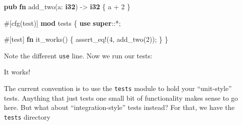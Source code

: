 \documentclass[a4paper,]{book}
\newenvironment{Shaded}{\begin{snugshade}}{\end{snugshade}}
\newcommand{\KeywordTok}[1]{\textcolor[rgb]{0.13,0.29,0.53}{\textbf{{#1}}}}
\newcommand{\DecValTok}[1]{\textcolor[rgb]{0.00,0.00,0.81}{{#1}}}
\newcommand{\OtherTok}[1]{\textcolor[rgb]{0.56,0.35,0.01}{{#1}}}
\newcommand{\NormalTok}[1]{{#1}}
\begin{document}
\begin{Shaded}
\begin{Highlighting}[]

\KeywordTok{pub} \KeywordTok{fn} \NormalTok{add_two(a: }\KeywordTok{i32}\NormalTok{) -> }\KeywordTok{i32} \NormalTok{\{}
    \NormalTok{a + }\DecValTok{2}
\NormalTok{\}}

\OtherTok{#[}\NormalTok{cfg}\OtherTok{(}\NormalTok{test}\OtherTok{)]}
\KeywordTok{mod} \NormalTok{tests \{}
    \KeywordTok{use} \KeywordTok{super}\NormalTok{::*;}

    \OtherTok{#[}\NormalTok{test}\OtherTok{]}
    \KeywordTok{fn} \NormalTok{it_works() \{}
        \OtherTok{assert_eq!}\NormalTok{(}\DecValTok{4}\NormalTok{, add_two(}\DecValTok{2}\NormalTok{));}
    \NormalTok{\}}
\NormalTok{\}}
\end{Highlighting}
\end{Shaded}

Note the different \texttt{use} line. Now we run our tests:

\begin{Shaded}
\end{Shaded}

It works!

The current convention is to use the \texttt{tests} module to hold your
``unit-style'' tests. Anything that just tests one small bit of
functionality makes sense to go here. But what about
``integration-style'' tests instead? For that, we have the
\texttt{tests} directory
\end{document}
